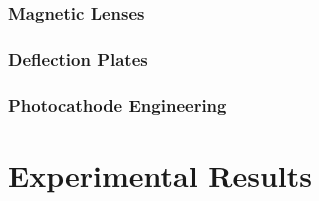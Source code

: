 \documentclass{uicthesi}
\begin{document}
\subsection{Magnetic Lenses}

\subsection{Deflection Plates}

\subsection{Photocathode Engineering}

\chapter{Experimental Results}

 


\end{document}
